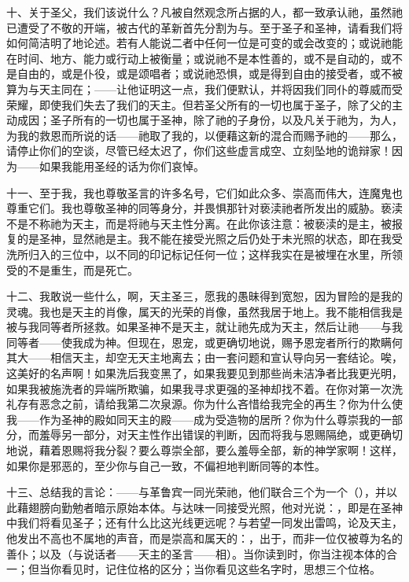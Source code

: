 十、关于圣父，我们该说什么？凡被自然观念所占据的人，都一致承认祂，虽然祂已遭受了不敬的开端，被古代的革新首先分割为与。至于圣子和圣神，请看我们将如何简洁明了地论述。若有人能说二者中任何一位是可变的或会改变的；或说祂能在时间、地方、能力或行动上被衡量；或说祂不是本性善的，或不是自动的，或不是自由的，或是仆役，或是颂唱者；或说祂恐惧，或是得到自由的接受者，或不被算为与天主同在；——让他证明这一点，我们便默认，并将因我们同仆的尊威而受荣耀，即使我们失去了我们的天主。但若圣父所有的一切也属于圣子，除了父的主动成因；圣子所有的一切也属于圣神，除了祂的子身份，以及凡关于祂为，为人，为我的救恩而所说的话——祂取了我的，以便藉这新的混合而赐予祂的——那么，请停止你们的空谈，尽管已经太迟了，你们这些虚言成空、立刻坠地的诡辩家！因为——如果我能用圣经的话为你们哀悼。\par

十一、至于我，我也尊敬圣言的许多名号，它们如此众多、崇高而伟大，连魔鬼也尊重它们。我也尊敬圣神的同等身分，并畏惧那针对亵渎祂者所发出的威胁。亵渎不是不称祂为天主，而是将祂与天主性分离。在此你该注意：被亵渎的是主，被报复的是圣神，显然祂是主。我不能在接受光照之后仍处于未光照的状态，即在我受洗所归入的三位中，以不同的印记标记任何一位；这样我实在是被埋在水里，所领受的不是重生，而是死亡。\par

十二、我敢说一些什么，啊，天主圣三，愿我的愚昧得到宽恕，因为冒险的是我的灵魂。我也是天主的肖像，属天的光荣的肖像，虽然我居于地上。我不能相信我是被与我同等者所拯救。如果圣神不是天主，就让祂先成为天主，然后让祂——与我同等者——使我成为神。但现在，恩宠，或更确切地说，赐予恩宠者所行的欺瞒何其大——相信天主，却空无天主地离去；由一套问题和宣认导向另一套结论。唉，这美好的名声啊！如果洗后我变黑了，如果我要见到那些尚未洁净者比我更光明，如果我被施洗者的异端所欺骗，如果我寻求更强的圣神却找不着。在你对第一次洗礼存有恶念之前，请给我第二次泉源。你为什么吝惜给我完全的再生？你为什么使我——作为圣神的殿如同天主的殿——成为受造物的居所？你为什么尊崇我的一部分，而羞辱另一部分，对天主性作出错误的判断，因而将我与恩赐隔绝，或更确切地说，藉着恩赐将我分裂？要么尊崇全部，要么羞辱全部，新的神学家啊！这样，如果你是邪恶的，至少你与自己一致，不偏袒地判断同等的本性。\par

十三、总结我的言论：——与革鲁宾一同光荣祂，他们联合三个为一个（），并以此藉翅膀向勤勉者暗示原始本体。与达味一同接受光照，他对光说：，即是在圣神中我们将看见圣子；还有什么比这光线更远呢？与若望一同发出雷鸣，论及天主，他发出不高也不属地的声音，而是崇高和属天的：，出于，而非一位仅被尊为名的善仆；以及（与说话者——天主的圣言——相）。当你读到时，你当注视本体的合一；但当你看见时，记住位格的区分；当你看见这些名字时，思想三个位格。\par

